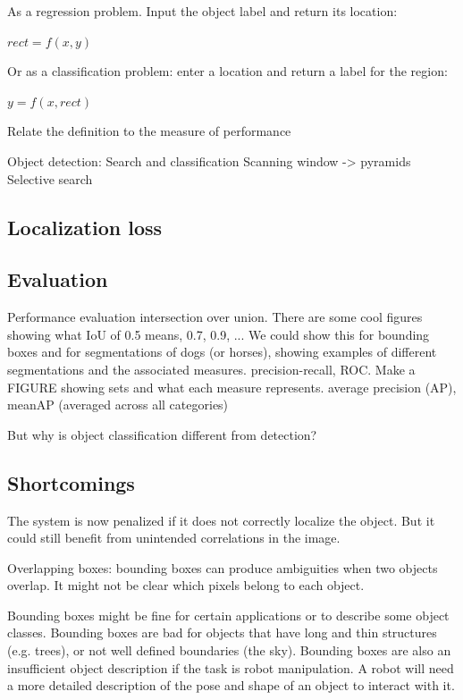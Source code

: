 As a regression problem. Input the object label and return its location:

$rect = f(x, y)$

Or as a classification problem: enter a location and return a label for the region:

$y = f(x, rect)$

Relate the definition to the measure of performance

Object detection: Search and classification
		Scanning window -> pyramids
		Selective search
		
\subsection{Localization loss}

\subsection{Evaluation}

Performance evaluation
		intersection over union. There are some  cool figures showing what IoU of 0.5 means, 0.7, 0.9, ... We could show this for bounding boxes and for segmentations  of dogs (or horses), showing examples of different segmentations and the associated measures. 
		precision-recall, ROC. Make a FIGURE  showing sets and what  each  measure represents. 
		average  precision  (AP), meanAP   (averaged across all categories)	
		
But why is object classification different from detection?

\subsection{Shortcomings}



The system is now penalized if it does not correctly localize the object. But it could still benefit from unintended correlations in the image. 

Overlapping boxes: bounding boxes can produce ambiguities when two objects overlap. It might not be clear which pixels belong to each object. 

Bounding boxes might be fine for certain applications or to describe some object classes. Bounding boxes are bad for objects that have long and thin structures (e.g. trees), or not well defined boundaries (the sky). Bounding boxes are also an insufficient object description if the task is robot manipulation. A robot will need a more detailed description of the pose and shape of an object to interact with it. 

